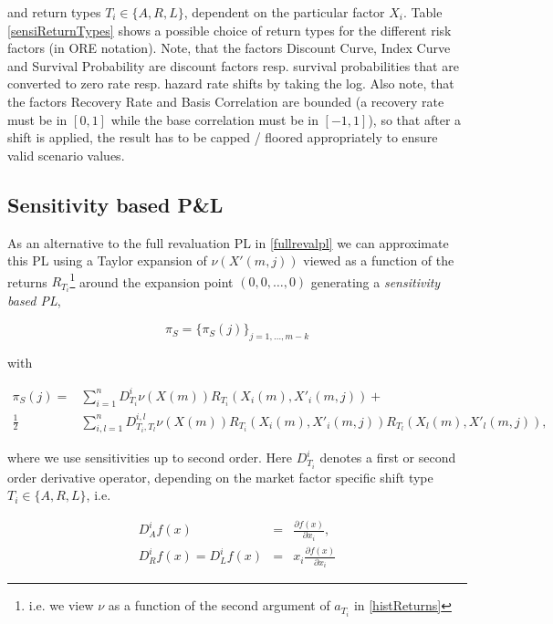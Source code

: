 and return types $T_i \in \{ A, R, L \}$, dependent on the particular factor $X_i$. Table \ref{sensiReturnTypes} shows a
possible choice of return types for the different risk factors (in ORE notation). Note, that the factors Discount
Curve, Index Curve and Survival Probability are discount factors resp. survival probabilities that are converted to zero
rate resp. hazard rate shifts by taking the log. Also note, that the factors Recovery Rate and Basis Correlation are
bounded (a recovery rate must be in $[0,1]$ while the base correlation must be in $[-1,1]$), so that after a shift is
applied, the result has to be capped / floored appropriately to ensure valid scenario values.

\subsection*{Sensitivity based P\&L}\label{sensipl}

As an alternative to the full revaluation PL in \eqref{fullrevalpl} we can approximate this PL using a Taylor expansion
of $\nu(X'(m,j))$ viewed as a function of the returns $R_{T_i}$\footnote{i.e. we view $\nu$ as a function of the second
argument of $a_{T_i}$ in \ref{histReturns}} around the expansion point $(0,0,\ldots,0)$ generating a {\em sensitivity
  based PL},

\begin{equation}
\pi_S = \{ \pi_S(j) \}_{j=1,\ldots,m-k}
\end{equation}

with

\begin{equation}
\begin{aligned}\label{taylorPl}
  \pi_S(j) = & \sum_{i=1}^n D^i_{T_i}\nu(X(m)) R_{T_i}(X_i(m), X'_i(m,j)) + \\
           \frac{1}{2}& \sum_{i,l=1}^n D^{i,l}_{T_i,T_l}\nu(X(m)) R_{T_i}(X_i(m), X'_i(m,j)) R_{T_l}(X_l(m), X'_l(m,j)),
\end{aligned}
\end{equation}

where we use sensitivities up to second order. Here $D^i_{T_i}$ denotes a first or second order derivative operator, depending
on the market factor specific shift type $T_i \in \{ A,R,L \}$, i.e.

\begin{eqnarray}\label{derivs}
  D^i_A f(x) &=& \frac{\partial f(x)}{\partial x_i}, \\
  D^i_R f(x) = D^i_L f(x) &=& x_i\frac{\partial f(x)}{\partial x_i}
\end{eqnarray}

